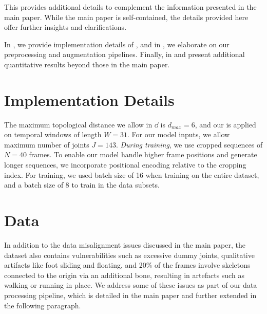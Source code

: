 This \fi provides additional details to complement the information presented in the main paper. While the main paper is self-contained, the details provided here offer further insights and clarifications.

In , we provide implementation details of \algoname, and in , we elaborate on our preprocessing and augmentation pipelines. Finally, in  and present additional quantitative results beyond those in the main paper.


\section{Implementation Details} \label{sec:imp_detail}
The maximum topological distance we allow in $\dd$ is $d_{max}=6$, and our \emph{\tempattn} is applied on temporal windows of length $W=31$. For our model inputs, we allow maximum number of joints $J=143$. \emph{During training}, we use cropped sequences of $N=40$ frames. To enable our model handle higher frame positions and generate longer sequences, we incorporate positional encoding relative to the cropping index.
For training, we used batch size of 16 when training on the entire dataset, and a batch size of 8 to train in the data subsets.


\section{Data} \label{sec:data}
 In addition to the data misalignment issues discussed in the main paper, the dataset also contains vulnerabilities such as excessive dummy joints, qualitative artifacts like foot sliding and floating, and 20\% of the frames involve skeletons connected to the origin via an additional bone, resulting in artefacts such as walking or running in place. We address some of these issues as part of our data processing pipeline, which is detailed in the main paper and further extended in the following paragraph.

